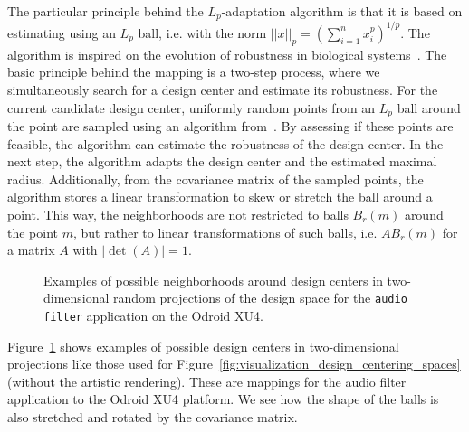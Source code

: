 The particular principle behind the $L_p$-adaptation algorithm is that it is based on estimating using an $L_p$ ball, i.e. with the norm $||x||_p = (\sum_{i=1}^n x_i^p)^{1/p}$.
The algorithm is inspired on the evolution of robustness in biological systems~\cite{asmus2017lp}.
The basic principle behind the mapping is a two-step process, where we simultaneously search for a design center and estimate its robustness.
For the current candidate design center, uniformly random points from an $L_p$ ball around the point are sampled using an algorithm from~\cite{calafiore1998uniform}.
By assessing if these points are feasible, the algorithm can estimate the robustness of the design center.
In the next step, the algorithm adapts the design center and the estimated maximal radius.
Additionally, from the covariance matrix of the sampled points, the algorithm stores a linear transformation to skew or stretch the ball around a point.
This way, the neighborhoods are not restricted to balls $B_r(m)$ around the point $m$, but rather to linear transformations of such balls, i.e. $A B_r(m)$ for a matrix $A$ with $|\operatorname{det}(A)| = 1$.

\begin{figure}[h]
	\centering
	\caption{Examples of possible neighborhoods around design centers in two-dimensional random projections of the design space for the \texttt{audio filter} application on the Odroid XU4.}
	\label{fig:design_centering_exynos_examples}
\end{figure}

Figure~\ref{fig:design_centering_exynos_examples} shows examples of possible design centers in two-dimensional projections like those used for Figure~\ref{fig:visualization_design_centering_spaces} (without the artistic rendering).
These are mappings for the audio filter application to the Odroid XU4 platform.
We see how the shape of the balls is also stretched and rotated by the covariance matrix.

